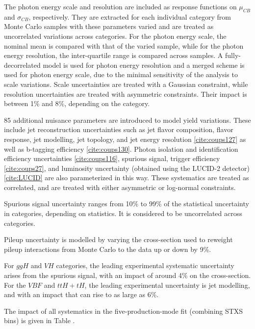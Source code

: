 The photon energy scale and resolution are included as response functions on $\mu_{CB}$ and $\sigma_{CB}$, respectively. They are extracted for each individual category from Monte Carlo samples with these parameters varied and are treated as uncorrelated variations across categories. For the photon energy scale, the nominal mean is compared with that of the varied sample, while for the photon energy resolution, the inter-quartile range is compared across samples. A fully-decorrelated model is used for photon energy resolution and a merged scheme is used for photon energy scale, due to the minimal sensitivity of the analysis to scale variations. Scale uncertainties are treated with a Gaussian constraint, while resolution uncertainties are treated with asymmetric constraints. Their impact is between 1\% and 8\%, depending on the category.

85 additional nuisance parameters are introduced to model yield variations. These include jet reconstruction uncertainties such as jet flavor composition, flavor response, jet modelling, jet topology, and jet energy resolution \ref{cite:coups127} as well as b-tagging efficiency \ref{cite:coups130}. Photon isolation and identification efficiency uncertainties \ref{cite:coups116}, spurious signal, trigger efficiency \ref{cite:coups27}, and luminosity uncertainty (obtained using the LUCID-2 detector) \ref{cite:LUCID} are also parameterized in this way. These systematics are treated as correlated, and are treated with either asymmetric or log-normal constraints.

Spurious signal uncertainty ranges from 10\% to 99\% of the statistical uncertainty in categories, depending on statistics. It is considered to be uncorrelated across categories.

Pileup uncertainty is modelled by varying the cross-section used to reweight pileup interactions from Monte Carlo to the data up or down by 9\%. 

For $ggH$ and $VH$ categories, the leading experimental systematic uncertainty arises from the spurious signal, with an impact of around 4\% on the cross-section. For the $VBF$ and $ttH+tH$, the leading experimental uncertainty is jet modelling, and with an impact that can rise to as large as 6\%.

The impact of all systematics in the five-production-mode fit (combining STXS bins) is given in Table \label{tab:result:systematic}. 

